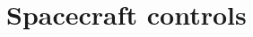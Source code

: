 \documentclass[Orbiter User Manual.tex]{subfiles}
\begin{document}
\section{Spacecraft controls}

\end{document}
